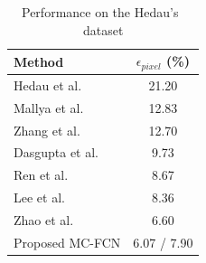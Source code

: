 \begin{table}
	\centering 
	\begin{tabular}{lc}
		\toprule
		Method & $\epsilon_{pixel}$ (\%) \\
		\midrule
		Hedau et al.~\cite{hedau2009recovering} & 21.20 \\
		Mallya et al.~\cite{mallya2015learning} & 12.83 \\
		Zhang et al.~\cite{zhang2017learning} & 12.70 \\
		Dasgupta et al.~\cite{dasgupta2016delay} & 9.73 \\
		Ren et al.~\cite{ren2016coarse} & 8.67 \\
		Lee et al.~\cite{LeeRoomNet17} & 8.36 \\
		Zhao et al.~\cite{zhao2017physics} & 6.60 \\
		\midrule
		Proposed MC-FCN & 6.07 / 7.90 \\
		\bottomrule
	\end{tabular}
	\caption{Performance on the Hedau's~\cite{hedau2009recovering} dataset }
	\label{table:comparison-hedau}
\end{table}



